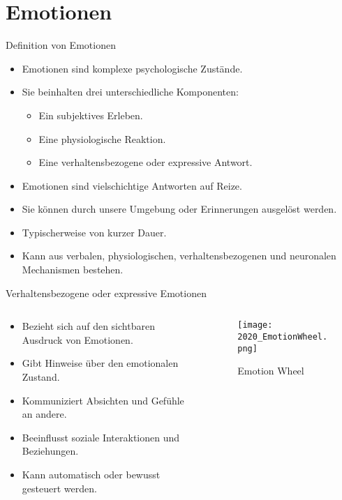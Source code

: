 \documentclass[aspectratio=169]{beamer}
\begin{document}
\section{Emotionen}
\begin{frame}{Definition von Emotionen}
  \begin{itemize}
    \item Emotionen sind komplexe psychologische Zustände.
    \item Sie beinhalten drei unterschiedliche Komponenten:
          \begin{itemize}
            \item Ein subjektives Erleben.
            \item Eine physiologische Reaktion.
            \item Eine verhaltensbezogene oder expressive Antwort.
          \end{itemize}
    \item Emotionen sind vielschichtige Antworten auf Reize.
    \item Sie können durch unsere Umgebung oder Erinnerungen ausgelöst werden.
    \item Typischerweise von kurzer Dauer.
    \item Kann aus verbalen, physiologischen, verhaltensbezogenen und neuronalen Mechanismen bestehen.
  \end{itemize}
\end{frame}

\begin{frame}{Verhaltensbezogene oder expressive Emotionen}
  \begin{columns}
    \begin{column}{0.6\textwidth}
      \begin{itemize}
        \item Bezieht sich auf den sichtbaren Ausdruck von Emotionen.
        \item Gibt Hinweise über den emotionalen Zustand.
        \item Kommuniziert Absichten und Gefühle an andere.
        \item Beeinflusst soziale Interaktionen und Beziehungen.
        \item Kann automatisch oder bewusst gesteuert werden.
      \end{itemize}
    \end{column}
    \begin{column}{0.4\textwidth}
      \begin{figure}[h]
        \centering
        \texttt{[image: 2020\_EmotionWheel.png]}
        \caption{Emotion Wheel}
      \end{figure}
    \end{column}
  \end{columns}
\end{frame}
\end{document}
